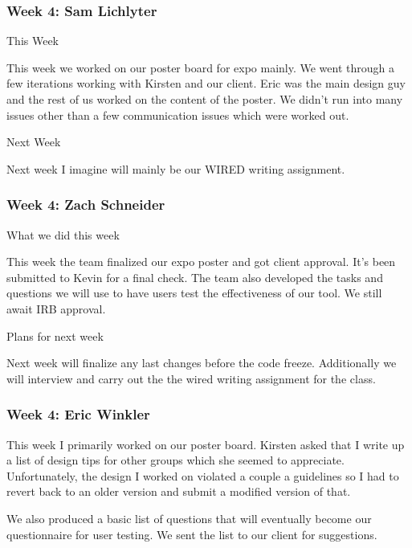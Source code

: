  \subsubsection{Week 4: Sam Lichlyter}

This Week

This week we worked on our poster board for expo mainly. We went through a few iterations working with Kirsten and our client. Eric was the main design guy and the rest of us worked on the content of the poster. We didn't run into many issues other than a few communication issues which were worked out. 



Next Week

Next week I imagine will mainly be our WIRED writing assignment.  \\ 

 \subsubsection{Week 4: Zach Schneider}

What we did this week

This week the team finalized our expo poster and got client approval. It's been submitted to Kevin for a final check. The team also developed the tasks and questions we will use to have users test the effectiveness of our tool. We still await IRB approval. 

Plans for next week

Next week will finalize any last changes before the code freeze. Additionally we will interview and carry out the the wired writing assignment for the class. \\ 

 \subsubsection{Week 4: Eric Winkler}

This week I primarily worked on our poster board. Kirsten asked that I write up a list of design tips for other groups which she seemed to appreciate. Unfortunately, the design I worked on violated a couple a guidelines so I had to revert back to an older version and submit a modified version of that.



We also produced a basic list of questions that will eventually become our questionnaire for user testing. We sent the list to our client for suggestions.



